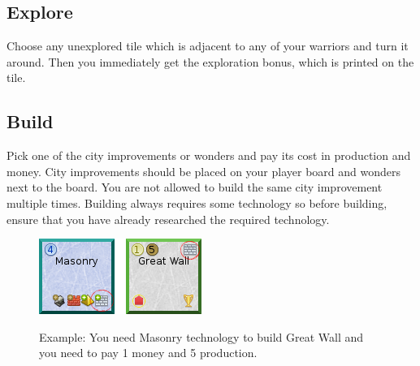 \documentclass[11pt,a4paper,titlepage]{article}
\begin{document}
{{  }\label{subsec:move}
  \subsection{Explore}{
    Choose any unexplored tile which is adjacent to any of your warriors and
    turn it around. Then you immediately get the exploration bonus, which is
    printed on the tile.
  }\label{subsec:explore}
  \subsection{Build}{
    Pick one of the city improvements or wonders and pay its cost in production
    and money. City improvements should be placed on your player board and
    wonders next to the board. You are not allowed to build the same city
    improvement multiple times. Building always requires some technology so
    before building, ensure that you have already researched the required
    technology.

    \begin{figure}[!htb]
      \begin{minipage}[c]{0.2\textwidth}
        \label{fig:tech_irrigation}
        \includegraphics[scale=.6]{doe_example_build.png}
      \end{minipage}\hfill
      \begin{minipage}[c]{0.55\textwidth}
        \captionsetup{labelformat=empty, justification=justified, singlelinecheck=false}
        \caption{Example: You need Masonry technology to build Great Wall and you need to pay 1 money and 5 production.}
      \end{minipage}\hfill
      \label{fig:example_towns}
    \end{figure}

  }\label{subsec:build}
}
\end{document}
